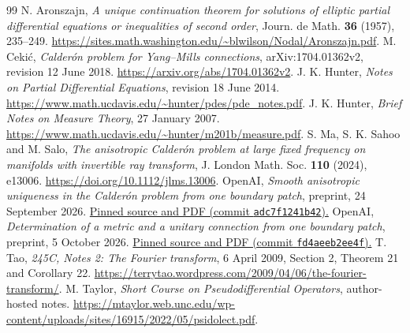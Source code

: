 \documentclass[11pt]{article}
\theoremstyle{definition}\newtheorem{definition}[theorem]{Definition}
\theoremstyle{remark}\newtheorem{remark}[theorem]{Remark}
\begin{document}
\begin{thebibliography}{99}
 N. Aronszajn,
\emph{A unique continuation theorem for solutions of elliptic partial
differential equations or inequalities of second order},
Journ. de Math. \textbf{36} (1957), 235--249.
\url{https://sites.math.washington.edu/~blwilson/Nodal/Aronszajn.pdf}.
 M. Ceki\'c,
\emph{Calder\'on problem for Yang--Mills connections},
arXiv:1704.01362v2, revision 12 June 2018.
\url{https://arxiv.org/abs/1704.01362v2}.
 J. K. Hunter,
\emph{Notes on Partial Differential Equations}, revision 18 June 2014.
\url{https://www.math.ucdavis.edu/~hunter/pdes/pde_notes.pdf}.
 J. K. Hunter,
\emph{Brief Notes on Measure Theory}, 27 January 2007.
\url{https://www.math.ucdavis.edu/~hunter/m201b/measure.pdf}.
 S. Ma, S. K. Sahoo and M. Salo,
\emph{The anisotropic Calder\'on problem at large fixed frequency on
manifolds with invertible ray transform},
J. London Math. Soc. \textbf{110} (2024), e13006.
\url{https://doi.org/10.1112/jlms.13006}.
 OpenAI,
\emph{Smooth anisotropic uniqueness in the Calder\'on problem from one
boundary patch}, preprint, 24 September 2026.
\href{https://github.com/openai/math/tree/adc7f1241b42e322a6451854ab7e4b4c146bf78a/preprints/Smooth-Anisotropic-Uniqueness-in-the-Calderon-Problem-from-One-Boundary-Patch-September-24-2026}{Pinned source and PDF (commit \texttt{adc7f1241b42}).}
 OpenAI,
\emph{Determination of a metric and a unitary connection from one boundary
patch}, preprint, 5 October 2026.
\href{https://github.com/openai/math/tree/fd4aeeb2ee4fc729c18d98444fed42fd0529eeeb/preprints/Determination-of-a-metric-and-a-unitary-connection-from-one-boundary-patch-October-5-2026}{Pinned source and PDF (commit \texttt{fd4aeeb2ee4f}).}
 T. Tao,
\emph{245C, Notes 2: The Fourier transform}, 6 April 2009,
Section 2, Theorem 21 and Corollary 22.
\url{https://terrytao.wordpress.com/2009/04/06/the-fourier-transform/}.
 M. Taylor,
\emph{Short Course on Pseudodifferential Operators}, author-hosted notes.
\url{https://mtaylor.web.unc.edu/wp-content/uploads/sites/16915/2022/05/psidolect.pdf}.
\end{thebibliography}
\end{document}

